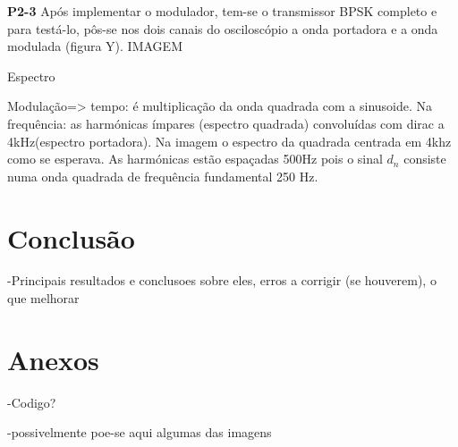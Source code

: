 \documentclass[11pt]{article}
\begin{document}
\textbf{P2-3}
Após implementar o modulador, tem-se o transmissor BPSK completo e para testá-lo, pôs-se nos dois canais do osciloscópio a onda portadora e a onda modulada (figura Y).
IMAGEM 

Espectro

Modulação=> tempo: é multiplicação da onda quadrada com a sinusoide. Na frequência: as harmónicas ímpares (espectro quadrada) convoluídas com dirac a 4kHz(espectro portadora).
Na imagem o espectro da quadrada centrada em 4khz como se esperava. As harmónicas estão espaçadas 500Hz pois o sinal $d_n$ consiste numa onda quadrada de frequência fundamental 250 Hz.


\section{Conclusão}
-Principais resultados e conclusoes sobre eles, erros a corrigir (se houverem), o que melhorar

\section{Anexos}
-Codigo?

-possivelmente poe-se aqui algumas das imagens	
\end{document}
